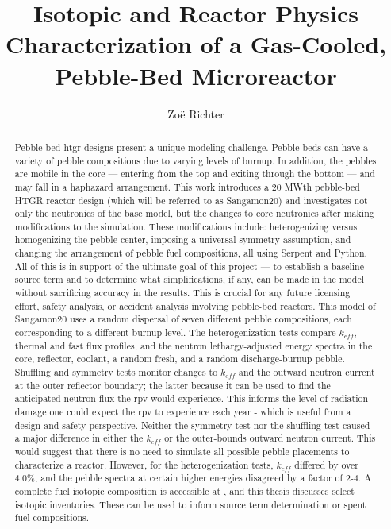 \documentclass[edeposit,fullpage]{uiucthesis2018}
\title{Isotopic and Reactor Physics Characterization of a Gas-Cooled, Pebble-Bed Microreactor}
\author{Zo{\"e} Richter}
\begin{document}
\maketitle

\frontmatter
\begin{abstract}
Pebble-bed \acrfull{htgr} designs present a unique modeling challenge.  Pebble-beds can have a variety of pebble compositions due to varying levels of burnup.  In addition, the pebbles are mobile in the core --- entering from the top and exiting through the bottom --- and may fall in a haphazard arrangement.  This work introduces a 20 MWth pebble-bed HTGR reactor design (which will be referred to as Sangamon20) and investigates not only the neutronics of the base model, but the changes to core neutronics after making modifications to the simulation.  These modifications include: heterogenizing versus homogenizing the pebble center, imposing a universal symmetry assumption, and changing the arrangement of pebble fuel compositions, all using Serpent and Python.  All of this is in support of the ultimate goal of this project --- to establish a baseline source term and to determine what simplifications, if any, can be made in the model without sacrificing accuracy in the results.  This is crucial for any future licensing effort, safety analysis, or accident analysis involving pebble-bed reactors.  This model of Sangamon20 uses a random dispersal of seven different pebble compositions, each corresponding to a different burnup level.  The heterogenization tests compare $k_{eff}$, thermal and fast flux profiles, and the neutron lethargy-adjusted energy spectra in the core, reflector, coolant, a random fresh, and a random discharge-burnup pebble.  Shuffling and symmetry tests monitor changes to $k_{eff}$ and the outward neutron current at the outer reflector boundary; the latter because it can be used to find the anticipated neutron flux the \acrfull{rpv} would experience.  This informs the level of radiation damage one could expect the \acrshort{rpv} to experience each year - which is useful from a design and safety perspective.  Neither the symmetry test nor the shuffling test caused a major difference in either the $k_{eff}$ or the outer-bounds outward neutron current.  This would suggest that there is no need to simulate all possible pebble placements to characterize a reactor.  However, for the heterogenization tests, $k_{eff}$ differed by over 4.0\%, and the pebble spectra at certain higher energies disagreed by a factor of 2-4.  A complete fuel isotopic composition is accessible at \cite{richter_isotopic_2021}, and this thesis discusses select isotopic inventories.  These can be used to inform source term determination or spent fuel compositions.

\end{abstract}
\end{document}
